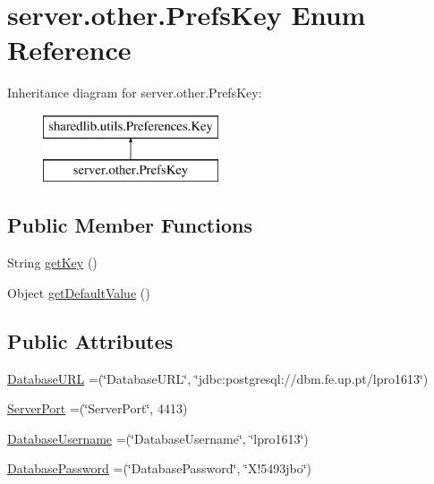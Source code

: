 \hypertarget{enumserver_1_1other_1_1_prefs_key}{}\section{server.\+other.\+Prefs\+Key Enum Reference}
\label{enumserver_1_1other_1_1_prefs_key}
Inheritance diagram for server.\+other.\+Prefs\+Key\+:\begin{figure}[H]
\begin{center}
\leavevmode
\includegraphics[height=2.000000cm]{enumserver_1_1other_1_1_prefs_key}
\end{center}
\end{figure}
\subsection*{Public Member Functions}
\begin{DoxyCompactItemize}
\item 
String \hyperlink{enumserver_1_1other_1_1_prefs_key_ad5cccedaf5ffa4e7cadbb08e025c2dbc}{get\+Key} ()
\item 
Object \hyperlink{enumserver_1_1other_1_1_prefs_key_a351b0589a30646eb7cd76560905cbc1a}{get\+Default\+Value} ()
\end{DoxyCompactItemize}
\subsection*{Public Attributes}
\begin{DoxyCompactItemize}
\item 
\hyperlink{enumserver_1_1other_1_1_prefs_key_a793fc1a6571d3ee5edd1a6d092402b0a}{Database\+U\+RL} =(\char`\"{}Database\+U\+RL\char`\"{}, \char`\"{}jdbc\+:postgresql\+://dbm.\+fe.\+up.\+pt/lpro1613\char`\"{})
\item 
\hyperlink{enumserver_1_1other_1_1_prefs_key_a97c1897d83b59cf6735643e3b50d549b}{Server\+Port} =(\char`\"{}Server\+Port\char`\"{}, 4413)
\item 
\hyperlink{enumserver_1_1other_1_1_prefs_key_ae50ad92fb11fa5b0ff6f0f5b980d81d0}{Database\+Username} =(\char`\"{}Database\+Username\char`\"{}, \char`\"{}lpro1613\char`\"{})
\item 
\hyperlink{enumserver_1_1other_1_1_prefs_key_adb071a6655a9d117eb717dbe536cd378}{Database\+Password} =(\char`\"{}Database\+Password\char`\"{}, \char`\"{}X!5493jbo\char`\"{})
\end{DoxyCompactItemize}


